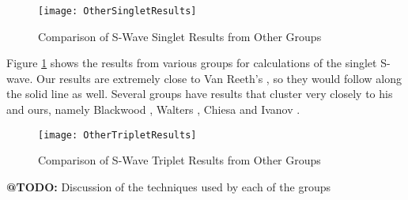 \documentclass[Dissertation.tex]{subfiles}
\begin{document}
\begin{figure}[H]
	\centering
	\texttt{[image: OtherSingletResults]}
	\caption{Comparison of S-Wave Singlet Results from Other Groups}
	\label{fig:OtherSingletResults}
\end{figure}

Figure \ref{fig:OtherSingletResults} shows the results from various groups for calculations of the singlet S-wave.  Our results are extremely close to Van Reeth's \cite{VanReeth2003}, so they would follow along the solid line as well.  Several groups have results that cluster very closely to his and ours, namely Blackwood \cite{Blackwood2002}, Walters \cite{Walters2004}, Chiesa \cite{Chiesa2002} and Ivanov \cite{Ivanov2002}.

\begin{figure}[H]
	\centering
	\texttt{[image: OtherTripletResults]}
	\caption{Comparison of S-Wave Triplet Results from Other Groups}
	\label{fig:OtherTripletResults}
\end{figure}

\textbf{@TODO:} Discussion of the techniques used by each of the groups
\end{document}
